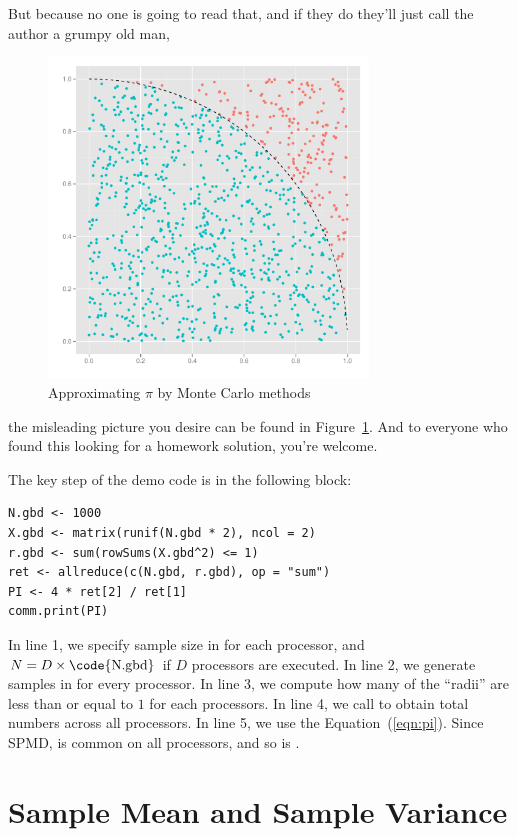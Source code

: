 But because no one is going to read that, and if they do they'll just call the
author a grumpy old man,
\begin{figure}[h]
\centering
 \includegraphics[height=8.5cm, width=8.5cm]{pbdDEMO-include/pics/misleading}
 \caption[Approximating $\pi$]{Approximating $\pi$ by Monte Carlo methods}\label{pic:dumb}
\end{figure}
the misleading picture you desire can be found in Figure~\ref{pic:dumb}.
And to everyone who found this looking for a homework solution, you're welcome.

The key step of the demo code is in the following block:
\begin{lstlisting}[language=rr,title=R Code]
N.gbd <- 1000
X.gbd <- matrix(runif(N.gbd * 2), ncol = 2)
r.gbd <- sum(rowSums(X.gbd^2) <= 1)
ret <- allreduce(c(N.gbd, r.gbd), op = "sum")
PI <- 4 * ret[2] / ret[1]
comm.print(PI)
\end{lstlisting}

In line 1, we specify sample size in  for each processor,
and $N=D\times\mbox{\code{N.gbd}}$ if $D$ processors are executed.
In line 2, we generate samples in  for every processor.
In line 3, we compute how many of the ``radii'' are less than or equal to $1$
for each processors.
In line 4, we call 
to obtain total numbers across all processors.
In line 5, we use the Equation~(\ref{eqn:pi}).
Since SPMD,  is common on all processors, and so is .





\section[Sample Mean and Sample Variance]{Sample Mean and Sample Variance}%
\label{sec:sample_stat}

